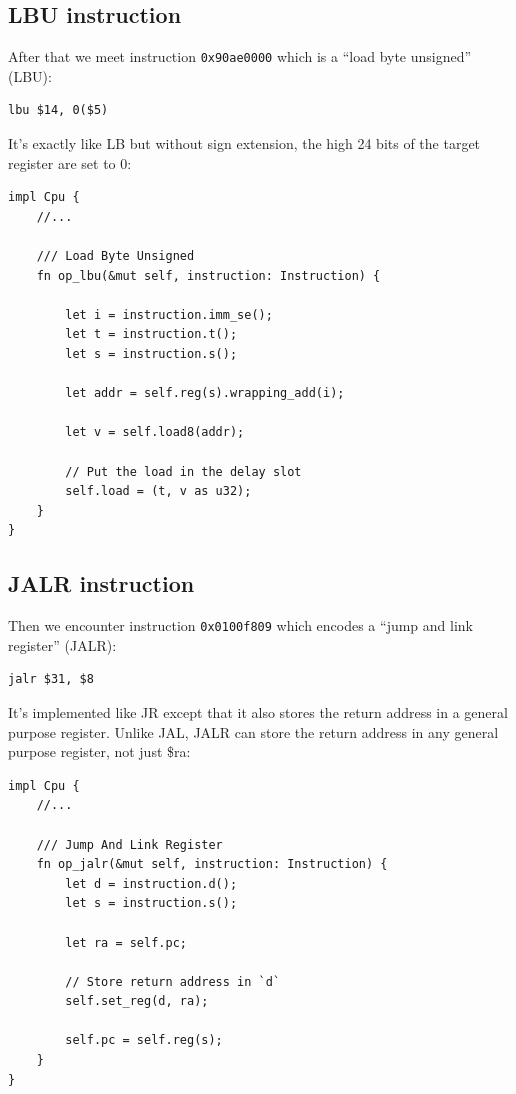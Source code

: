 \documentclass[a4paper]{article}
\newcommand{\code}[1] {\texttt{#1}}
\begin{document}
\subsection{LBU instruction}

After that we meet instruction \code{0x90ae0000} which is a ``load
byte unsigned'' (LBU):

\begin{lstlisting}[language=assembly]
lbu $14, 0($5)
\end{lstlisting}

It's exactly like LB but without sign extension, the high 24 bits of
the target register are set to 0:

\begin{lstlisting}
impl Cpu {
    //...

    /// Load Byte Unsigned
    fn op_lbu(&mut self, instruction: Instruction) {

        let i = instruction.imm_se();
        let t = instruction.t();
        let s = instruction.s();

        let addr = self.reg(s).wrapping_add(i);

        let v = self.load8(addr);

        // Put the load in the delay slot
        self.load = (t, v as u32);
    }
}
\end{lstlisting}

\subsection{JALR instruction}

Then we encounter instruction \code{0x0100f809} which encodes a ``jump
and link register'' (JALR):

\begin{lstlisting}[language=assembly]
jalr $31, $8
\end{lstlisting}

It's implemented like JR except that it also stores the return address
in a general purpose register. Unlike JAL, JALR can store the return
address in any general purpose register, not just \$ra:

\begin{lstlisting}
impl Cpu {
    //...

    /// Jump And Link Register
    fn op_jalr(&mut self, instruction: Instruction) {
        let d = instruction.d();
        let s = instruction.s();

        let ra = self.pc;

        // Store return address in `d`
        self.set_reg(d, ra);

        self.pc = self.reg(s);
    }
}
\end{lstlisting}
\end{document}
